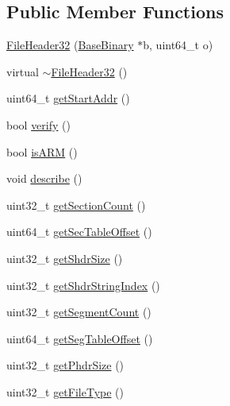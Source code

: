 \subsection*{\-Public \-Member \-Functions}
\begin{DoxyCompactItemize}
\item 
\hyperlink{class_e_p_a_x_1_1_elf_1_1_file_header32_abffac5321d1935c5a829715f5d4dbd63}{\-File\-Header32} (\hyperlink{class_e_p_a_x_1_1_base_binary}{\-Base\-Binary} $\ast$b, uint64\-\_\-t o)
\item 
virtual \hyperlink{class_e_p_a_x_1_1_elf_1_1_file_header32_aa3b5df3c225b2aa6b08a6378e16677c1}{$\sim$\-File\-Header32} ()
\item 
uint64\-\_\-t \hyperlink{class_e_p_a_x_1_1_elf_1_1_file_header32_ab8a7bf656d86963f9324b2c3686090e1}{get\-Start\-Addr} ()
\item 
bool \hyperlink{class_e_p_a_x_1_1_elf_1_1_file_header32_a39dbffddc4e4503da772ebcd66c9c760}{verify} ()
\item 
bool \hyperlink{class_e_p_a_x_1_1_elf_1_1_file_header32_af3918b11e74da5f92738df8c70c34258}{is\-A\-R\-M} ()
\item 
void \hyperlink{class_e_p_a_x_1_1_elf_1_1_file_header32_a85d8cd834a2410f5f51b8a92ca499058}{describe} ()
\item 
uint32\-\_\-t \hyperlink{class_e_p_a_x_1_1_elf_1_1_file_header32_ac1dd93429930f0a1f5991cb6270a383e}{get\-Section\-Count} ()
\item 
uint64\-\_\-t \hyperlink{class_e_p_a_x_1_1_elf_1_1_file_header32_a8d5c87c8f17e8e6666fde733f9267bae}{get\-Sec\-Table\-Offset} ()
\item 
uint32\-\_\-t \hyperlink{class_e_p_a_x_1_1_elf_1_1_file_header32_a0ed67a18b9abbe58cd2527e4c67d04e6}{get\-Shdr\-Size} ()
\item 
uint32\-\_\-t \hyperlink{class_e_p_a_x_1_1_elf_1_1_file_header32_a06e25aa5ff7df704d070abaa8ba3c1aa}{get\-Shdr\-String\-Index} ()
\item 
uint32\-\_\-t \hyperlink{class_e_p_a_x_1_1_elf_1_1_file_header32_ac38fc67d4991960a64e43418355847dc}{get\-Segment\-Count} ()
\item 
uint64\-\_\-t \hyperlink{class_e_p_a_x_1_1_elf_1_1_file_header32_a726775497585b20e7b5bfcf523492824}{get\-Seg\-Table\-Offset} ()
\item 
uint32\-\_\-t \hyperlink{class_e_p_a_x_1_1_elf_1_1_file_header32_ac888b12b41b187273440a028e1b704ca}{get\-Phdr\-Size} ()
\item 
uint32\-\_\-t \hyperlink{class_e_p_a_x_1_1_elf_1_1_file_header32_af3a51f4aeb49bc78ac18cbb3e8931a5a}{get\-File\-Type} ()
\end{DoxyCompactItemize}



